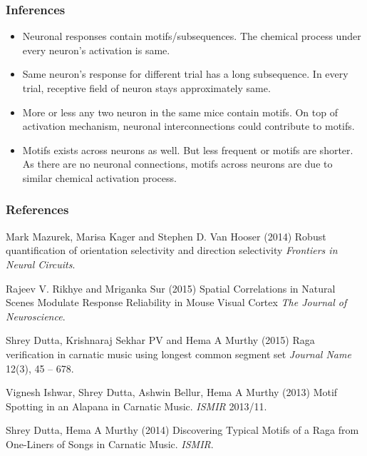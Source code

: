 \documentclass{beamer}
\begin{document}
\begin{frame}
\frametitle{Inferences}
\begin{itemize}
    \item Neuronal responses contain motifs/subsequences. The chemical process under every neuron's activation is same.
    \item Same neuron's response for different trial has a long subsequence. In every trial, receptive field of neuron stays approximately same.
    \item More or less any two neuron in the same mice contain motifs. On top of activation mechanism, neuronal interconnections could contribute to motifs.
    \item Motifs exists across neurons as well. But less frequent or motifs are shorter. As there are no neuronal connections, motifs across neurons are due to similar chemical activation process.
\end{itemize}
\end{frame}


\begin{frame}
\frametitle{References}
\footnotesize{
\begin{thebibliography}{99} %

 Mark Mazurek, Marisa Kager and Stephen D. Van Hooser (2014)
\newblock Robust quantification of orientation selectivity and direction selectivity
\newblock \emph{Frontiers in Neural Circuits}.

 Rajeev V. Rikhye and Mriganka Sur (2015)
\newblock Spatial Correlations in Natural Scenes Modulate Response Reliability in Mouse Visual Cortex
\newblock \emph{The Journal of Neuroscience}.

 Shrey Dutta, Krishnaraj Sekhar PV and Hema A Murthy (2015)
\newblock Raga verification in carnatic music using longest common segment set
\newblock \emph{Journal Name} 12(3), 45 -- 678.

 Vignesh Ishwar, Shrey Dutta, Ashwin Bellur, Hema A Murthy (2013)
\newblock Motif Spotting in an Alapana in Carnatic Music.
\newblock \emph{ISMIR} 2013/11.

 Shrey Dutta, Hema A Murthy (2014)
\newblock Discovering Typical Motifs of a Raga from One-Liners of Songs in Carnatic Music.
\newblock \emph{ISMIR}.
\end{thebibliography}
}
\end{frame}
\end{document}

